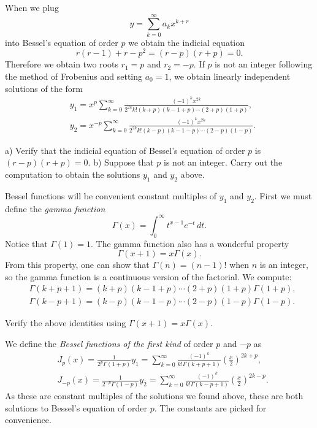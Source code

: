 \documentclass[12pt]{book}
\begin{document}
When we plug
\begin{equation*}
y = \sum_{k=0}^\infty a_k x^{k+r}
\end{equation*}
into Bessel's equation of order $p$ we obtain the indicial equation
\begin{equation*}
r(r-1)+r-p^2 = (r-p)(r+p) = 0 .
\end{equation*}
Therefore we obtain two roots $r_1 = p$ and $r_2 = -p$.
If $p$ is not an integer following the method of Frobenius and
setting $a_0 = 1$, we obtain
linearly independent solutions of the form
\begin{align*}
& y_1 = x^p \sum_{k=0}^\infty
\frac{{(-1)}^k x^{2k}}{2^{2k} k! (k+p)(k-1+p)\cdots (2+p)(1+p)} ,
\\
& y_2 = x^{-p} \sum_{k=0}^\infty
\frac{{(-1)}^k x^{2k}}{2^{2k} k! (k-p)(k-1-p)\cdots (2-p)(1-p)} .
\end{align*}

\begin{exercise}
a) Verify that the indicial equation of Bessel's equation of order $p$ is
$(r-p)(r+p)=0$.
b) Suppose that $p$ is not an integer.  Carry out the computation
to obtain the solutions $y_1$ and $y_2$ above.
\end{exercise}

Bessel functions will be convenient constant multiples of $y_1$ and $y_2$.
First we must define the \emph{gamma function}
\begin{equation*}
\Gamma(x) = \int_0^\infty t^{x-1} e^{-t} \, dt .
\end{equation*}
Notice that $\Gamma(1) = 1$.
The gamma function also has a wonderful property
\begin{equation*}
\Gamma(x+1) = x \Gamma(x) .
\end{equation*}
From this property, one can show that $\Gamma(n) = (n-1)!$ when $n$ is an
integer, so the gamma function is a continuous version of the factorial.  We
compute:
\begin{align*}
& \Gamma(k+p+1)=(k+p)(k-1+p)\cdots (2+p)(1+p) \Gamma(1+p) ,
\\
& \Gamma(k-p+1)=(k-p)(k-1-p)\cdots (2-p)(1-p) \Gamma(1-p) .
\end{align*}

\begin{exercise}
Verify the above identities using 
$\Gamma(x+1) = x \Gamma(x)$.
\end{exercise}

We define the \emph{Bessel functions of the first kind}%
 of
order $p$ and $-p$ as
\begin{align*}
& J_p(x) = \frac{1}{2^p\Gamma(1+p)} y_1
=
\sum_{k=0}^\infty
\frac{{(-1)}^k}{k! \Gamma(k+p+1)}
{\left(\frac{x}{2}\right)}^{2k+p} ,
\\
& J_{-p}(x) = \frac{1}{2^{-p}\Gamma(1-p)} y_2
=
\sum_{k=0}^\infty
\frac{{(-1)}^k}{k! \Gamma(k-p+1)}
{\left(\frac{x}{2}\right)}^{2k-p} .
\end{align*}
As these are constant multiples of the solutions we found above, these are
both solutions to Bessel's equation of order $p$.  The constants are picked
for convenience.
\end{document}
